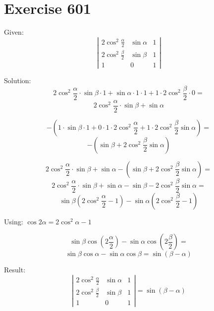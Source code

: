 \documentclass[a4paper, 10pt]{scrartcl}
\begin{document}
\section{Exercise 601}

Given:
\[
\left|
    \begin{array}{ccc}
    2\cos^{2}{\frac{\alpha}{2}} & \sin{\alpha} & 1\\
    2\cos^{2}{\frac{\beta}{2}} & \sin{\beta} & 1\\
    1 & 0 & 1
    \end{array}
\right|
\]

Solution:
\[
2\cos^{2}{\frac{\alpha}{2}}\cdot\sin{\beta}\cdot1 + \sin{\alpha}\cdot1\cdot1 + 1\cdot2\cos^{2}{\frac{\beta}{2}}\cdot0 =
\]
\[
2\cos^{2}{\frac{\alpha}{2}}\cdot\sin{\beta} + \sin{\alpha}
\]

\[
-(1\cdot\sin{\beta}\cdot1 + 0\cdot1\cdot2\cos^{2}{\frac{\alpha}{2}} + 1\cdot2\cos^{2}{\frac{\beta}{2}\sin{\alpha}}) =
\]
\[
-(\sin{\beta} + 2\cos^{2}{\frac{\beta}{2}\sin{\alpha}})
\]

\[
2\cos^{2}{\frac{\alpha}{2}}\cdot\sin{\beta} + \sin{\alpha} - (\sin{\beta} + 2\cos^{2}{\frac{\beta}{2}\sin{\alpha}}) =
\]
\[
2\cos^{2}{\frac{\alpha}{2}}\cdot\sin{\beta} + \sin{\alpha} - \sin{\beta} - 2\cos^{2}{\frac{\beta}{2}\sin{\alpha}} =
\]
\[
\sin{\beta}(2\cos^{2}{\frac{\alpha}{2}} - 1) - \sin{\alpha}(2\cos^{2}{\frac{\beta}{2}} - 1)
\]

Using: $\cos{2\alpha} = 2\cos^{2}{\alpha} - 1$

\[
\sin{\beta}\cos{(2\frac{\alpha}{2})} - \sin{\alpha}\cos{(2\frac{\beta}{2})} =
\]
\[
\sin{\beta}\cos{\alpha} - \sin{\alpha}\cos{\beta} = \sin{(\beta - \alpha)}
\]

Result:
\[
\left|
    \begin{array}{ccc}
    2\cos^{2}{\frac{\alpha}{2}} & \sin{\alpha} & 1\\
    2\cos^{2}{\frac{\beta}{2}} & \sin{\beta} & 1\\
    1 & 0 & 1
    \end{array}
\right| = \sin{(\beta - \alpha)}
\]
\end{document}
